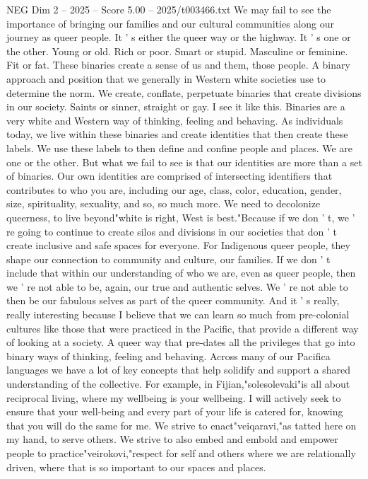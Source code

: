 \begin{textsample}{NEG Dim 2 – 2025 – Score 5.00 – 2025/t003466.txt}
We may fail to see the importance of bringing our families and our cultural communities along our journey as queer people.
It ' s either the queer way or the highway.
It ' s one or the other.
Young or old.
Rich or poor.
Smart or stupid.
Masculine or feminine.
Fit or fat.
These binaries create a sense of us and them, those people.
A binary approach and position that we generally in Western white societies use to determine the norm.
We create, conflate, perpetuate binaries that create divisions in our society.
Saints or sinner, straight or gay.
I see it like this.
Binaries are a very white and Western way of thinking, feeling and behaving.
As individuals today, we live within these binaries and create identities that then create these labels.
We use these labels to then define and confine people and places.
We are one or the other.
But what we fail to see is that our identities are more than a set of binaries.
Our own identities are comprised of intersecting identifiers that contributes to who you are, including our age, class, color, education, gender, size, spirituality, sexuality, and so, so much more.
We need to decolonize queerness, to live beyond"white is right, West is best."Because if we don ' t, we ' re going to continue to create silos and divisions in our societies that don ' t create inclusive and safe spaces for everyone.
For Indigenous queer people, they shape our connection to community and culture, our families.
If we don ' t include that within our understanding of who we are, even as queer people, then we ' re not able to be, again, our true and authentic selves.
We ' re not able to then be our fabulous selves as part of the queer community.
And it ' s really, really interesting because I believe that we can learn so much from pre-colonial cultures like those that were practiced in the Pacific, that provide a different way of looking at a society.
A queer way that pre-dates all the privileges that go into binary ways of thinking, feeling and behaving.
Across many of our Pacifica languages we have a lot of key concepts that help solidify and support a shared understanding of the collective.
For example, in Fijian,"solesolevaki"is all about reciprocal living, where my wellbeing is your wellbeing.
I will actively seek to ensure that your well-being and every part of your life is catered for, knowing that you will do the same for me.
We strive to enact"veiqaravi,"as tatted here on my hand, to serve others.
We strive to also embed and embold and empower people to practice"veirokovi,"respect for self and others where we are relationally driven, where that is so important to our spaces and places.

\end{textsample}
